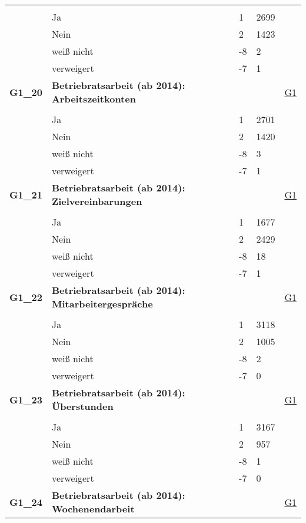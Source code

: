 \begin{longtable}{| L{2.5cm} | L{8.25cm}| C{1.5cm} | R{1.25cm} | C{2.25cm} |  }
   &  &  &  &  \\ 
   & Ja & 1 & 2699 &  \\ 
   & Nein & 2 & 1423 &  \\ 
   & weiß nicht & -8 & 2 &  \\ 
   & verweigert & -7 & 1 &  \\ 
   \midrule
\textbf{G1\_20}\label{var:suf:G1:20} & \textbf{Betriebratsarbeit (ab 2014): Arbeitszeitkonten} &  &  & \hyperref[G1]{G1} \\ 
   &  &  &  &  \\ 
   & Ja & 1 & 2701 &  \\ 
   & Nein & 2 & 1420 &  \\ 
   & weiß nicht & -8 & 3 &  \\ 
   & verweigert & -7 & 1 &  \\ 
   \midrule
\textbf{G1\_21}\label{var:suf:G1:21} & \textbf{Betriebratsarbeit (ab 2014): Zielvereinbarungen} &  &  & \hyperref[G1]{G1} \\ 
   &  &  &  &  \\ 
   & Ja & 1 & 1677 &  \\ 
   & Nein & 2 & 2429 &  \\ 
   & weiß nicht & -8 & 18 &  \\ 
   & verweigert & -7 & 1 &  \\ 
   \midrule
\textbf{G1\_22}\label{var:suf:G1:22} & \textbf{Betriebratsarbeit (ab 2014): Mitarbeitergespräche} &  &  & \hyperref[G1]{G1} \\ 
   &  &  &  &  \\ 
   & Ja & 1 & 3118 &  \\ 
   & Nein & 2 & 1005 &  \\ 
   & weiß nicht & -8 & 2 &  \\ 
   & verweigert & -7 & 0 &  \\ 
   \midrule
\textbf{G1\_23}\label{var:suf:G1:23} & \textbf{Betriebratsarbeit (ab 2014): Überstunden} &  &  & \hyperref[G1]{G1} \\ 
   &  &  &  &  \\ 
   & Ja & 1 & 3167 &  \\ 
   & Nein & 2 & 957 &  \\ 
   & weiß nicht & -8 & 1 &  \\ 
   & verweigert & -7 & 0 &  \\ 
   \midrule
\textbf{G1\_24}\label{var:suf:G1:24} & \textbf{Betriebratsarbeit (ab 2014): Wochenendarbeit} &  &  & \hyperref[G1]{G1} \\ 

\end{longtable}

